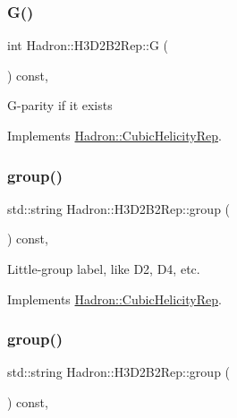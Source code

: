 \subsubsection{\texorpdfstring{G()}{G()}\hspace{0.1cm}{\footnotesize\ttfamily [3/3]}}
{\footnotesize\ttfamily int Hadron\+::\+H3\+D2\+B2\+Rep\+::G (\begin{DoxyParamCaption}{ }\end{DoxyParamCaption}) const\hspace{0.3cm}{\ttfamily [inline]}, {\ttfamily [virtual]}}

G-\/parity if it exists 

Implements \mbox{\hyperlink{structHadron_1_1CubicHelicityRep_a50689f42be1e6170aa8cf6ad0597018b}{Hadron\+::\+Cubic\+Helicity\+Rep}}.

\mbox{\label{structHadron_1_1H3D2B2Rep_a54d96e4bedb375325552d1f5e8149f30}} 
\subsubsection{\texorpdfstring{group()}{group()}\hspace{0.1cm}{\footnotesize\ttfamily [1/5]}}
{\footnotesize\ttfamily std\+::string Hadron\+::\+H3\+D2\+B2\+Rep\+::group (\begin{DoxyParamCaption}{ }\end{DoxyParamCaption}) const\hspace{0.3cm}{\ttfamily [inline]}, {\ttfamily [virtual]}}

Little-\/group label, like D2, D4, etc. 

Implements \mbox{\hyperlink{structHadron_1_1CubicHelicityRep_a101a7d76cd8ccdad0f272db44b766113}{Hadron\+::\+Cubic\+Helicity\+Rep}}.

\mbox{\label{structHadron_1_1H3D2B2Rep_a54d96e4bedb375325552d1f5e8149f30}} 
\subsubsection{\texorpdfstring{group()}{group()}\hspace{0.1cm}{\footnotesize\ttfamily [2/5]}}
{\footnotesize\ttfamily std\+::string Hadron\+::\+H3\+D2\+B2\+Rep\+::group (\begin{DoxyParamCaption}{ }\end{DoxyParamCaption}) const\hspace{0.3cm}{\ttfamily [inline]}, {\ttfamily [virtual]}}

